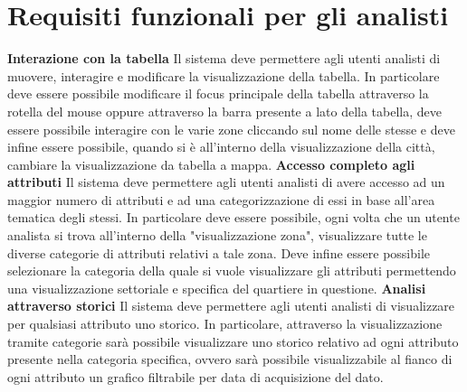     \section{Requisiti funzionali per gli analisti}
        \begin{rfList}
            \rfItem \textbf{Interazione con la tabella} Il sistema deve permettere agli utenti analisti di muovere, interagire e modificare la visualizzazione della tabella. In particolare deve essere possibile modificare il focus principale della tabella attraverso la rotella del mouse oppure attraverso la barra presente a lato della tabella, deve essere possibile interagire con le varie zone cliccando sul nome delle stesse e deve infine essere possibile, quando si è all'interno della visualizzazione della città, cambiare la visualizzazione da tabella a mappa.
            \rfItem \textbf{Accesso completo agli attributi} Il sistema deve permettere agli utenti analisti di avere accesso ad un maggior numero di attributi e ad una categorizzazione di essi in base all'area tematica degli stessi. In particolare deve essere possibile, ogni volta che un utente analista si trova all'interno della "visualizzazione zona", visualizzare tutte le diverse categorie di attributi relativi a tale zona. Deve infine essere possibile selezionare la categoria della quale si vuole visualizzare gli attributi permettendo una visualizzazione settoriale e specifica del quartiere in questione.
            \rfItem \textbf{Analisi attraverso storici} Il sistema deve permettere agli utenti analisti di visualizzare per qualsiasi attributo uno storico. In particolare, attraverso la visualizzazione tramite categorie sarà possibile visualizzare uno storico relativo ad ogni attributo presente nella categoria specifica, ovvero sarà possibile visualizzabile al fianco di ogni attributo un grafico filtrabile per data di acquisizione del dato.
        \end{rfList}
